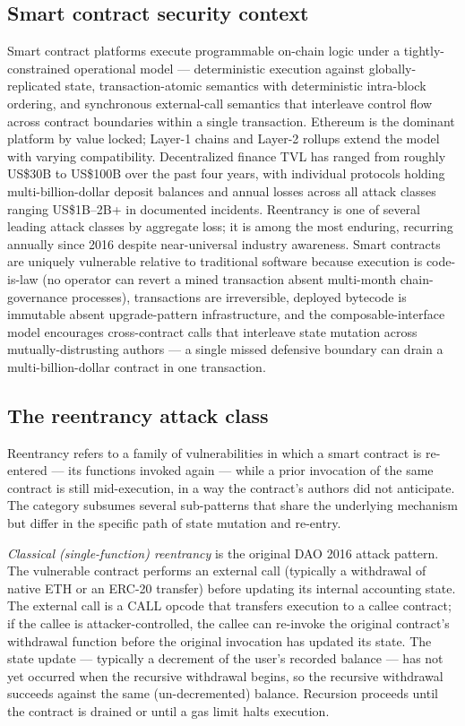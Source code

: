 \subsection{Smart contract security
context}\label{smart-contract-security-context}

Smart contract platforms execute programmable on-chain logic under a
tightly-constrained operational model --- deterministic execution
against globally-replicated state, transaction-atomic semantics with
deterministic intra-block ordering, and synchronous external-call
semantics that interleave control flow across contract boundaries within
a single transaction. Ethereum is the dominant platform by value locked;
Layer-1 chains and Layer-2 rollups extend the model with varying
compatibility. Decentralized finance TVL has ranged from roughly US\$30B
to US\$100B over the past four years, with individual protocols holding
multi-billion-dollar deposit balances and annual losses across all
attack classes ranging US\$1B--2B+ in documented incidents. Reentrancy
is one of several leading attack classes by aggregate loss; it is among
the most enduring, recurring annually since 2016 despite near-universal
industry awareness. Smart contracts are uniquely vulnerable relative to
traditional software because execution is code-is-law (no operator can
revert a mined transaction absent multi-month chain-governance
processes), transactions are irreversible, deployed bytecode is
immutable absent upgrade-pattern infrastructure, and the
composable-interface model encourages cross-contract calls that
interleave state mutation across mutually-distrusting authors --- a
single missed defensive boundary can drain a multi-billion-dollar
contract in one transaction.

\subsection{The reentrancy attack
class}\label{the-reentrancy-attack-class}

Reentrancy refers to a family of vulnerabilities in which a smart
contract is re-entered --- its functions invoked again --- while a prior
invocation of the same contract is still mid-execution, in a way the
contract's authors did not anticipate. The category subsumes several
sub-patterns that share the underlying mechanism but differ in the
specific path of state mutation and re-entry.

\emph{Classical (single-function) reentrancy} is the original DAO 2016
attack pattern. The vulnerable contract performs an external call
(typically a withdrawal of native ETH or an ERC-20 transfer) before
updating its internal accounting state. The external call is a CALL
opcode that transfers execution to a callee contract; if the callee is
attacker-controlled, the callee can re-invoke the original contract's
withdrawal function before the original invocation has updated its
state. The state update --- typically a decrement of the user's recorded
balance --- has not yet occurred when the recursive withdrawal begins,
so the recursive withdrawal succeeds against the same (un-decremented)
balance. Recursion proceeds until the contract is drained or until a gas
limit halts execution.

